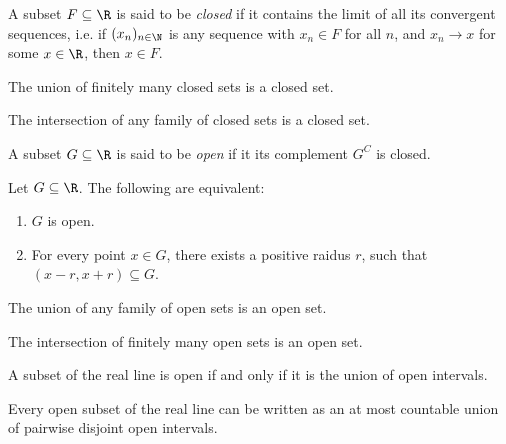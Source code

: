 \documentclass{article}
\begin{document}
\begin{definition}
    A subset $F\subseteq\R$ is said to be \emph{closed} if it contains the limit of all 
    its convergent sequences, i.e. if $(x_n)_{n\in\N}$ is any sequence with $x_n\in F$
    for all $n$, and $x_n\to x$ for some $x\in\R$, then $x\in F$. 
\end{definition}

\begin{proposition}[Notes 2.2]
    The union of finitely many closed sets is a closed set.
\end{proposition}

\begin{proposition}[Notes 2.4]
    The intersection of any family of closed sets is a closed set.
\end{proposition}

\begin{definition}
    A subset $G\subseteq\R$ is said to be \emph{open} if it its complement $G^C$ is closed.
\end{definition}

\begin{proposition}[Notes 2.6]
    Let $G\subseteq\R$. The following are equivalent:
    \begin{enumerate}
        \item $G$ is open.
        \item For every point $x\in G$, there exists a positive raidus $r$, such that 
            $(x-r,x+r)\subseteq G$.
    \end{enumerate}
\end{proposition}

\begin{proposition}[Notes 2.8]
    The union of any family of open sets is an open set. 
\end{proposition}

\begin{proposition}[Notes 2.9]
    The intersection of finitely many open sets is an open set.
\end{proposition}

\begin{theorem}[Notes 2.10]
    A subset of the real line is open if and only if it is the union of open intervals.
\end{theorem}

\begin{theorem}[Notes 2.11]
    Every open subset of the real line can be written as an at most countable union 
    of pairwise disjoint open intervals.
\end{theorem}
\end{document}
